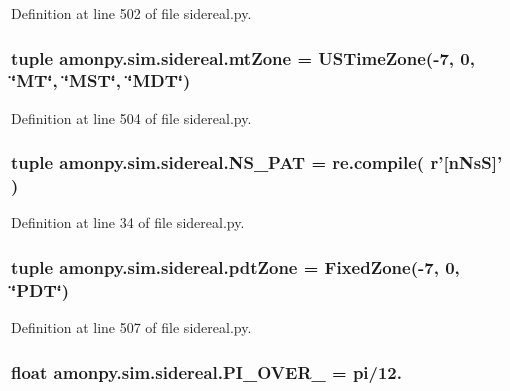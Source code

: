 Definition at line 502 of file sidereal.\-py.

\hypertarget{namespaceamonpy_1_1sim_1_1sidereal_aa9cbae5e2822246d12d6bca4aaf10043}{
\subsubsection[{mt\-Zone}]{\setlength{\rightskip}{0pt plus 5cm}tuple amonpy.\-sim.\-sidereal.\-mt\-Zone = {\bf U\-S\-Time\-Zone}(-\/7, 0, \char`\"{}M\-T\char`\"{}, \char`\"{}M\-S\-T\char`\"{}, \char`\"{}M\-D\-T\char`\"{})}}\label{namespaceamonpy_1_1sim_1_1sidereal_aa9cbae5e2822246d12d6bca4aaf10043}


Definition at line 504 of file sidereal.\-py.

\hypertarget{namespaceamonpy_1_1sim_1_1sidereal_a0d12929ddde8e73c7a5caace56f4c6c5}{
\subsubsection[{N\-S\-\_\-\-P\-A\-T}]{\setlength{\rightskip}{0pt plus 5cm}tuple amonpy.\-sim.\-sidereal.\-N\-S\-\_\-\-P\-A\-T = re.\-compile( r'\mbox{[}n\-Ns\-S\mbox{]}' )}}\label{namespaceamonpy_1_1sim_1_1sidereal_a0d12929ddde8e73c7a5caace56f4c6c5}


Definition at line 34 of file sidereal.\-py.

\hypertarget{namespaceamonpy_1_1sim_1_1sidereal_a5151d2554a093a90f7908e5e3dba4279}{
\subsubsection[{pdt\-Zone}]{\setlength{\rightskip}{0pt plus 5cm}tuple amonpy.\-sim.\-sidereal.\-pdt\-Zone = {\bf Fixed\-Zone}(-\/7, 0, \char`\"{}P\-D\-T\char`\"{})}}\label{namespaceamonpy_1_1sim_1_1sidereal_a5151d2554a093a90f7908e5e3dba4279}


Definition at line 507 of file sidereal.\-py.

\hypertarget{namespaceamonpy_1_1sim_1_1sidereal_a6dc0322580f236f140468b48d70edc82}{
\subsubsection[{P\-I\-\_\-\-O\-V\-E\-R\-\_\-12}]{\setlength{\rightskip}{0pt plus 5cm}float amonpy.\-sim.\-sidereal.\-P\-I\-\_\-\-O\-V\-E\-R\-\_ = pi/12.}}\label{namespaceamonpy_1_1sim_1_1sidereal_a6dc0322580f236f140468b48d70edc82}



